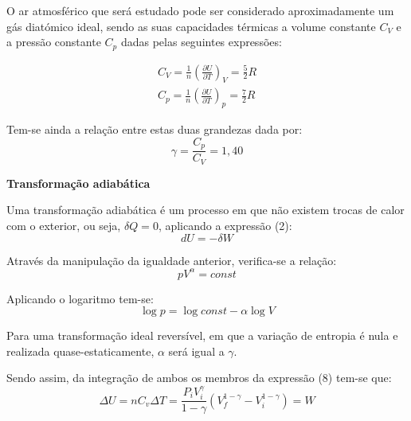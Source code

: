 \documentclass[9pt]{extarticle}
\begin{document}
\begin{multicols}{2}
\par O ar atmosférico que será estudado pode ser considerado aproximadamente um gás diatómico ideal, sendo as suas capacidades térmicas a volume constante $C_V$ e a pressão constante $C_p$ dadas pelas seguintes expressões:

\begin{eqnarray}
C_V = \frac{1}{n} \left(\frac{\partial U}{\partial T}\right)_V = \frac{5}{2} R \\
C_p = \frac{1}{n} \left(\frac{\partial U}{\partial T}\right)_p = \frac{7}{2} R
\end{eqnarray}

Tem-se ainda a relação entre estas duas grandezas dada por:
\begin{equation}
\gamma = \frac{C_p}{C_V} = 1,40
\end{equation}

\textbf{Transformação adiabática}

\par Uma transformação adiabática é um processo em que não existem trocas de calor com o exterior, ou seja, $\delta Q = 0$, aplicando a expressão (2):
\begin{equation}
dU = -\delta W 
\end{equation}

\par Através da manipulação da igualdade anterior, verifica-se a relação: 
\begin{equation}
pV^{\alpha} = const
\end{equation}
\par{}

\par Aplicando o logaritmo tem-se:
\begin{equation}
\log p = \log const - \alpha \log V
\end{equation}

\par Para uma transformação ideal reversível, em que a variação de entropia é nula e realizada quase-estaticamente, $\alpha$ será igual a $\gamma$.

\par Sendo assim, da integração de ambos os membros da expressão (8) tem-se que: 
\begin{equation}
\Delta U = n C_v \Delta T = \frac{P_i V_i^{\gamma}}{1-\gamma} (V_f ^{1-\gamma} - V_i ^{1-\gamma}) = W
\end{equation}
\par{}


\end{multicols}
\end{document}
